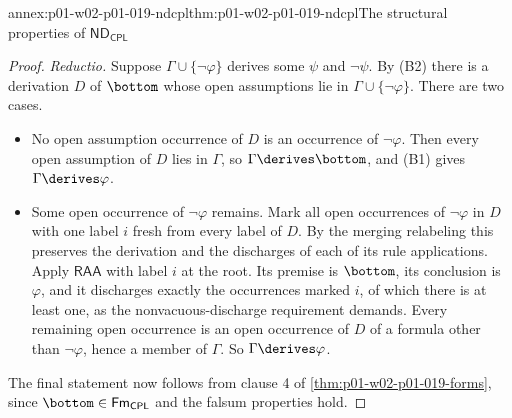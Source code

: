 \begin{annexitem}{annex:p01-w02-p01-019-ndcpl}{thm:p01-w02-p01-019-ndcpl}{The structural properties of \(\mathsf{ND}_{\mathsf{CPL}}\)}
\begin{proof}
\emph{Reductio.} Suppose \(\Gamma\cup\{\neg\varphi\}\) derives some \(\psi\)
and \(\neg\psi\). By (B2) there is a derivation \(D\) of \(\bottom\) whose
open assumptions lie in \(\Gamma\cup\{\neg\varphi\}\). There are two cases.
\begin{itemize}
  \item No open assumption occurrence of \(D\) is an occurrence of
        \(\neg\varphi\). Then every open assumption of \(D\) lies in
        \(\Gamma\), so \(\Gamma\derives\bottom\), and (B1) gives
        \(\Gamma\derives\varphi\).
  \item Some open occurrence of \(\neg\varphi\) remains. Mark all open
        occurrences of \(\neg\varphi\) in \(D\) with one label \(i\) fresh
        from every label of \(D\). By the merging relabeling this preserves
        the derivation and the discharges of each of its rule applications.
        Apply \(\mathsf{RAA}\) with label \(i\) at the root. Its premise is
        \(\bottom\), its conclusion is \(\varphi\), and it discharges exactly
        the occurrences marked \(i\), of which there is at least one, as the
        nonvacuous-discharge requirement demands. Every remaining open
        occurrence is an open occurrence of \(D\) of a formula other than
        \(\neg\varphi\), hence a member of \(\Gamma\). So
        \(\Gamma\derives\varphi\).
\end{itemize}
The final statement now follows from clause 4 of
\cref{thm:p01-w02-p01-019-forms}, since \(\bottom\in\mathsf{Fm}_{\mathsf{CPL}}\)
and the falsum properties hold.
\end{proof}
\end{annexitem}

